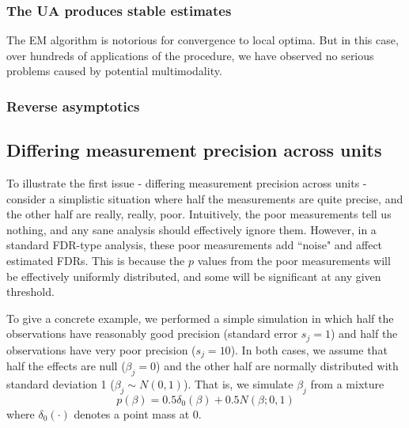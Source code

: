 \documentclass[11pt]{article}
\begin{document}
\subsubsection*{The UA produces stable estimates}

The EM algorithm is notorious for convergence to local optima. 
But in this case, over hundreds of applications of the procedure, we have observed no serious problems 
caused by potential multimodality. 



\subsubsection*{Reverse asymptotics}


\subsection*{Differing measurement precision across units}

 To illustrate the first issue - differing measurement precision across units - consider a simplistic
 situation where half the measurements are quite precise, and the other half are really, really, poor. 
 Intuitively, the poor measurements tell us nothing, and any sane analysis should effectively ignore them. However, in a standard FDR-type analysis, these poor measurements add ``noise" and affect estimated FDRs. This is because the $p$ values from the poor measurements will be effectively uniformly distributed, and some will be significant at any given threshold. 
 
To give a concrete example, we performed a simple simulation in which half the observations have
reasonably good precision (standard error $s_j = 1$) and half the observations have very poor precision ($s_j=10$). In both cases,
we assume that half the effects are null ($\beta_j=0$)
and the other half are normally distributed with standard deviation 1 ($\beta_j \sim N(0,1)$). 
That is, we simulate $\beta_j$ from a mixture 
\begin{equation}
p(\beta) = 0.5 \delta_0(\beta) + 0.5 N(\beta; 0,1)
\end{equation}
where $\delta_0(\cdot)$ denotes a point mass at 0.
\end{document}
